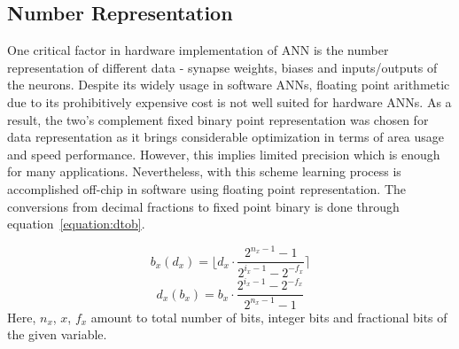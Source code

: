 \subsection*{Number Representation}

One critical factor in hardware implementation of ANN is the number representation of different data - synapse weights, biases and inputs/outputs of the neurons. Despite its widely usage in software ANNs, floating point arithmetic due to its prohibitively expensive cost is not well suited for hardware ANNs. As a result, the two's complement fixed binary point representation was chosen for data representation as it brings considerable optimization in terms of area usage and speed performance. However, this implies limited precision which is enough for many applications. Nevertheless, with this scheme learning process is accomplished off-chip in software using floating point representation. The conversions from decimal fractions to fixed point binary is done through equation~\ref{equation:dtob}.

\begin{equation}
b_{x}(d_{x})= \lfloor{d_{x}\cdot \frac{2^{n_{x}-1}-1}{2^{i_{x}-1}-2^{-f_{x}}}}\rceil
\label{equation:dtob}
\end{equation}
\begin{equation}
d_{x}(b_{x})= {b_{x}\cdot \frac{2^{i_{x}-1}-2^{-f_{x}}}{2^{n_{x}-1}-1}}
\label{equation:btod}
\end{equation}
Here, $n_{x}$, ${x}$, $f_{x}$ amount to total number of bits, integer bits and fractional bits of the given variable.
